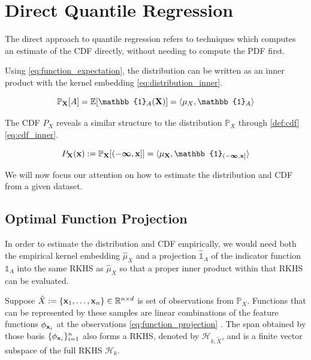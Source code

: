 \documentclass[twoside]{article} \usepackage{aistats2017}
\theoremstyle{definition}
\theoremstyle{theorem}
\newcommand{\rv}[1]{{#1}}
\newcommand{\ds}[1]{\tilde{#1}}
\begin{document}
\section{Direct Quantile Regression}
\label{sec:direct_quantile_regression}

	The direct approach to quantile regression refers to techniques which computes an estimate of the CDF directly, without needing to compute the PDF first.
	
	Using \eqref{eq:function_expectation}, the distribution can be written as an inner product with the kernel embedding \eqref{eq:distribution_inner}.
		
	\begin{equation}
		\mathbb{P}_{\bvec{\rv{X}}}[A] = \mathbb{E}[\mathbb{1}_{A}(\bvec{\rv{X}})] = \langle \mu_{\rv{X}}, \mathbb{1}_{A} \rangle
	\label{eq:distribution_inner}
	\end{equation}

	The CDF  $P_{\rv{X}}$ reveals a similar structure to the distribution $\mathbb{P}_{\rv{X}}$ through \cref{def:cdf} \eqref{eq:cdf_inner}.
			
	\begin{equation}
		P_{\bvec{\rv{X}}}(\bvec{x}) := \mathbb{P}_{\bvec{\rv{X}}}[(-\bm{\infty}, \bvec{x}]] = \langle \mu_{\bvec{\rv{X}}}, \mathbb{1}_{(-\bm{\infty}, \bvec{x}]} \rangle
	\label{eq:cdf_inner}
	\end{equation}

	We will now focus our attention on how to estimate the distribution and CDF from a given dataset.
	
	\subsection{Optimal Function Projection}
	\label{sec:direct_quantile_regression:optimal_function_approximation}
	
		In order to estimate the distribution and CDF empirically, we would need both the empirical kernel embedding $\hat{\mu}_{\rv{X}}$ and a projection $\hat{\mathbb{1}}_{A}$ of the indicator function $\mathbb{1}_{A}$ into the same RKHS as $\hat{\mu}_{\rv{X}}$ so that a proper inner product within that RKHS can be evaluated.

		Suppose $\ds{X} := \{\bvec{x}_{1}, \dots, \bvec{x}_{n}\} \in \mathbb{R}^{n \times d}$ is set of observations from $\mathbb{P}_{\rv{X}}$. Functions that can be represented by these samples are linear combinations of the feature functions $\phi_{\mathbf{x}_{i}}$ at the observations \eqref{eq:function_projection} \citep{muandet2016kernel}. The span obtained by those basis $\{\phi_{\mathbf{x}_{i}}\}_{i = 1}^{n}$ also forms a RKHS, denoted by $\mathcal{H}_{k, \ds{X}}$, and is a finite vector subspace of the full RKHS $\mathcal{H}_{k}$.
		
\end{document}

